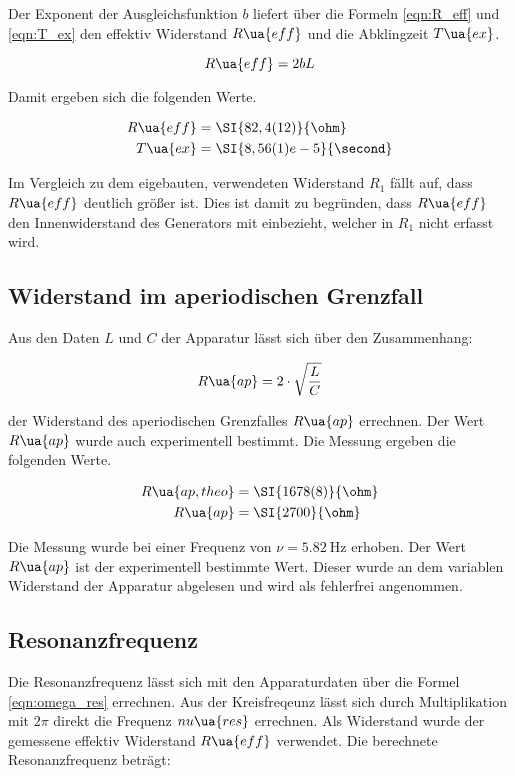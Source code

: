 Der Exponent der Ausgleichsfunktion $b$ liefert über die Formeln
\eqref{eqn:R_eff} und \eqref{eqn:T_ex}
den effektiv Widerstand $R\ua{eff}$ und die Abklingzeit $T\ua{ex}$.

\begin{equation}
  \label{eqn:R_eff}
  R\ua{eff} = 2 b L
\end{equation}

Damit ergeben sich die folgenden Werte.

\begin{align*}
  R\ua{eff} &= \SI{82,4(12)}{\ohm}\\
  T\ua{ex} &= \SI{8,56(1)e-5}{\second}
\end{align*}

Im Vergleich zu dem eigebauten, verwendeten Widerstand $R_1$ fällt auf, dass
$R\ua{eff}$ deutlich größer ist. Dies ist damit zu begründen, dass $R\ua{eff}$
den Innenwiderstand des Generators mit einbezieht, welcher in $R_1$ nicht erfasst
wird.

\subsection{Widerstand im aperiodischen Grenzfall}

Aus den Daten $L$ und $C$ der Apparatur lässt sich über den Zusammenhang:

\begin{equation*}
  R\ua{ap} = 2\cdot \sqrt{\frac{L}{C}}
\end{equation*}

der Widerstand des aperiodischen Grenzfalles $R\ua{ap}$ errechnen.
Der Wert $R\ua{ap}$ wurde auch experimentell bestimmt. Die Messung ergeben
die folgenden Werte.

\begin{align*}
  R\ua{ap,theo} &= \SI{1678(8)}{\ohm}\\
  R\ua{ap} &= \SI{2700}{\ohm}
\end{align*}

Die Messung wurde bei einer Frequenz von $\nu = \SI{5,82}{\hertz}$ erhoben.
Der Wert $R\ua{ap}$ ist der experimentell bestimmte Wert. Dieser wurde an
dem variablen Widerstand der Apparatur abgelesen und wird als fehlerfrei
angenommen.

\subsection{Resonanzfrequenz}

Die Resonanzfrequenz lässt sich mit den Apparaturdaten über die Formel \eqref{eqn:omega_res}
errechnen. Aus der Kreisfreqeunz lässt sich durch Multiplikation mit
$2\pi$ direkt die Frequenz $nu\ua{res}$ errechnen.
Als Widerstand wurde der gemessene effektiv Widerstand $R\ua{eff}$
verwendet.
Die berechnete Resonanzfrequenz beträgt:

